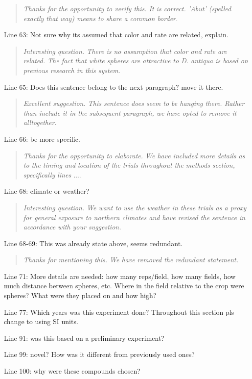 \documentclass{article}
\begin{document}
\begin{quote}
    \textit{Thanks for the opportunity to verify this.  It is correct.  'Abut' (spelled exactly that way) means to share a common border. }
\end{quote}

Line 63: Not sure why its assumed that color and rate are related, explain.  

\begin{quote}
    \textit{Interesting question.  There is no assumption that color and rate are related.  The fact that white spheres are attractive to \textit{D. antiqua} is based on previous research in this system.  }
\end{quote}

Line 65: Does this sentence belong to the next paragraph? move it there.

\begin{quote}
    \textit{Excellent suggestion.  This sentence does seem to be hanging there.  Rather than include it in the subsequent paragraph, we have opted to remove it alltogether.  }
\end{quote}

Line 66: be more specific.  

\begin{quote}
    \textit{Thanks for the opportunity to elaborate.  We have included more details as to the timing and location of the trials throughout the methods section, specifically lines .... }
\end{quote}


Line 68: climate or weather?

\begin{quote}
    \textit{Interesting question.  We want to use the weather in these trials as a proxy for general exposure to northern climates and have revised the sentence in accordance with your suggestion.  }
\end{quote}


Line 68-69: This was already state above, seems redundant.

\begin{quote}
    \textit{Thanks for mentioning this.  We have removed the redundant statement.  }
\end{quote}

Line 71: More details are needed: how many reps/field, how many fields, how much distance between spheres, etc. Where in the field relative to the crop were spheres? What were they placed on and how high?

\begin{quote}
    \textit{}
\end{quote}

Line 77: Which years was this experiment done? Throughout this section pls change to using SI units.

Line 91: was this based on a preliminary experiment?


Line 99: novel? How was it different from previously used ones?

Line 100: why were these compounds chosen?
\end{document}
